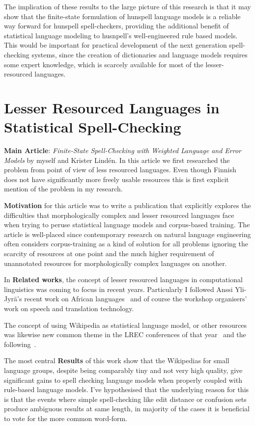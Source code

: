 \documentclass[officiallayout,draft]{unihelcompling}
\begin{document}
The implication of these results to the large picture of this research is
that it may show that the finite-state formulation of hunspell language models
is a reliable way forward for hunspell spell-checkers, providing the additional
benefit of statistical language modeling to husnpell's well-engineered
rule based models. This would be important for practical development of
the next generation spell-checking systems, since the creation of dictionaries
and language models requires some expert knowledge, which is scarcely available
for most of the lesser-resourced languages.

\section{Lesser Resourced Languages in Statistical Spell-Checking}

\textbf{Main Article}: \emph{Finite-State Spell-Checking with Weighted Language
and Error Models} by myself and Krister Lindén. In this article we first
researched the problem from point of view of less resourced languages. Even
though Finnish does not have significantly more freely usable resources this
is first explicit mention of the problem in my research.

\textbf{Motivation} for this article was to write a publication that
explicitly explores the difficulties that morphologically complex and lesser
resourced languages face when trying to peruse statistical language models and
corpus-based training. The article is well-placed since contemporary research
on natural language engineering often considers corpus-training as a kind of
solution for all problems ignoring the scarcity of resources at one point and
the much higher requirement of unannotated resources for morphologically
complex languages on another.

In \textbf{Related works}, the concept of lesser resourced languages in
computational linguistics was coming to focus in recent years. Particularly
I followed Anssi Yli-Jyrä's recent work on African languages~\cite{} and
of course the workshop organisers' work on speech and translation technology.

The concept of using Wikipedia as statistical language model, or other
resources was likewise new common theme in the LREC conferences of that
year~\cite{} and the following~\cite{}. 

The most central \textbf{Results} of this work show that the Wikipedias for
small language groups, despite being comparably tiny and not very high quality,
give significant gains to spell checking language models when properly
coupled with rule-based language models. I've hypothesised that the underlying
reason for this is that the events where simple spell-checking like edit
distance or confusion sets produce ambiguous results at same length, in
majority of the cases it is beneficial to vote for the more common word-form.
\end{document}
